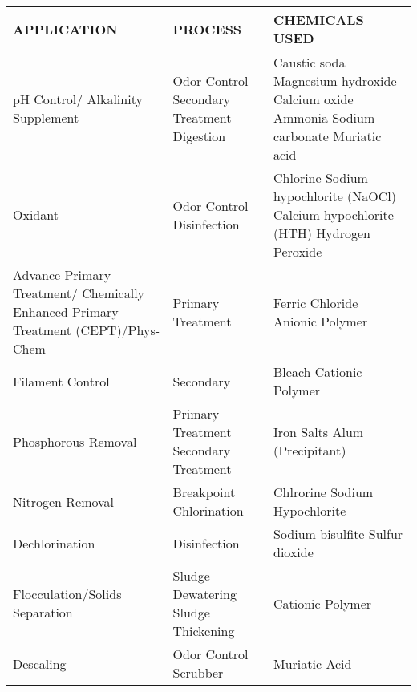 \begin{tabular}{ |p{5.5cm}|p{4.5cm}|p{5cm}|  }
\hspace{0.5cm}APPLICATION & \hspace{1.2 cm} PROCESS & \hspace{1.2 cm} CHEMICALS USED \\
\hline
pH Control/ \newline Alkalinity Supplement & Odor Control \newline Secondary Treatment \newline Digestion & Caustic soda \newline Magnesium hydroxide \newline Calcium oxide \newline Ammonia \newline Sodium carbonate \newline Muriatic acid\\
\hline
Oxidant & Odor Control \newline Disinfection & Chlorine \newline Sodium hypochlorite (NaOCl) \newline Calcium hypochlorite (HTH) \newline Hydrogen Peroxide\\
\hline
Advance Primary Treatment/ \newline Chemically Enhanced Primary Treatment (CEPT)/Phys-Chem & Primary Treatment & Ferric Chloride \newline Anionic Polymer\\
\hline
Filament Control & Secondary  & Bleach \newline Cationic Polymer\\
\hline
Phosphorous Removal  & Primary Treatment \newline Secondary Treatment & Iron Salts \newline Alum (Precipitant)\\
\hline
Nitrogen Removal  & Breakpoint Chlorination & Chlrorine \newline Sodium Hypochlorite\\
Dechlorination  & Disinfection & Sodium bisulfite  \newline Sulfur dioxide   \\
\hline
Flocculation/Solids Separation & Sludge Dewatering \newline Sludge Thickening & Cationic Polymer \\
\hline
Descaling & Odor Control Scrubber & Muriatic Acid \\
\hline
\end{tabular}

